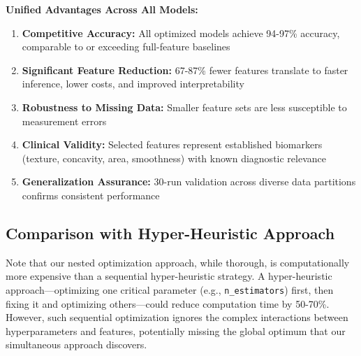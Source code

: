 \documentclass[12pt, a4paper]{article}
\begin{document}
\textbf{Unified Advantages Across All Models:}
\begin{enumerate}
    \item \textbf{Competitive Accuracy:} All optimized models achieve 94-97\% accuracy, comparable to or exceeding full-feature baselines
    \item \textbf{Significant Feature Reduction:} 67-87\% fewer features translate to faster inference, lower costs, and improved interpretability
    \item \textbf{Robustness to Missing Data:} Smaller feature sets are less susceptible to measurement errors
    \item \textbf{Clinical Validity:} Selected features represent established biomarkers (texture, concavity, area, smoothness) with known diagnostic relevance
    \item \textbf{Generalization Assurance:} 30-run validation across diverse data partitions confirms consistent performance
\end{enumerate}

\subsection{Comparison with Hyper-Heuristic Approach}
Note that our nested optimization approach, while thorough, is computationally more expensive than a sequential hyper-heuristic strategy. A hyper-heuristic approach—optimizing one critical parameter (e.g., \texttt{n\_estimators}) first, then fixing it and optimizing others—could reduce computation time by 50-70\%. However, such sequential optimization ignores the complex interactions between hyperparameters and features, potentially missing the global optimum that our simultaneous approach discovers.
\end{document}
